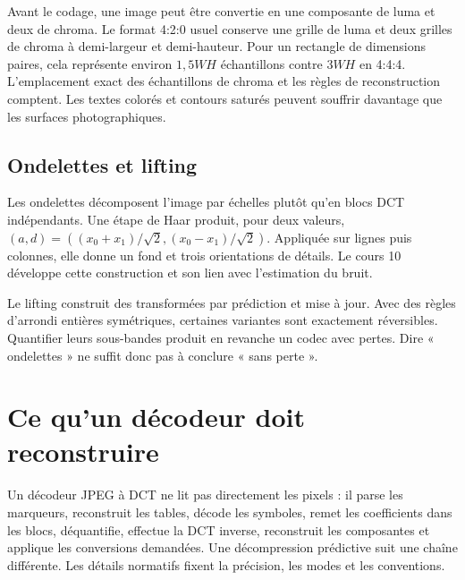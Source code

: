 Avant le codage, une image peut être convertie en une composante
de luma et deux de chroma. Le format 4:2:0 usuel conserve une
grille de luma et deux grilles de chroma à demi-largeur et
demi-hauteur. Pour un rectangle de dimensions paires, cela
représente environ $1{,}5WH$ échantillons contre $3WH$ en 4:4:4.
L'emplacement exact des échantillons de chroma et les règles de
reconstruction comptent. Les textes colorés et contours
saturés peuvent souffrir davantage que les surfaces photographiques.

\subsection{Ondelettes et lifting}
Les ondelettes décomposent l'image par échelles plutôt qu'en
blocs DCT indépendants. Une étape de Haar produit, pour deux
valeurs, $(a,d)=((x_0+x_1)/\sqrt2,(x_0-x_1)/\sqrt2)$.
Appliquée sur lignes puis colonnes, elle donne un fond et
trois orientations de détails. Le cours 10 développe cette
construction et son lien avec l'estimation du bruit.

Le lifting construit des transformées par prédiction et mise
à jour. Avec des règles d'arrondi entières symétriques,
certaines variantes sont exactement réversibles. Quantifier
leurs sous-bandes produit en revanche un codec avec pertes.
Dire « ondelettes » ne suffit donc pas à conclure « sans perte ».

\section{Ce qu'un décodeur doit reconstruire}
Un décodeur JPEG à DCT ne lit pas directement les pixels : il
parse les marqueurs, reconstruit les tables, décode les
symboles, remet les coefficients dans les blocs, déquantifie,
effectue la DCT inverse, reconstruit les composantes et applique
les conversions demandées. Une décompression prédictive suit
une chaîne différente. Les détails normatifs fixent la
précision, les modes et les conventions.

